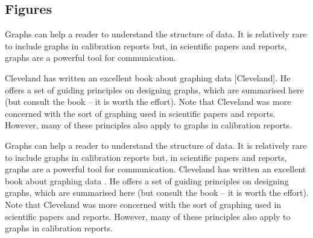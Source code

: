 \subsection{Figures}
Graphs can help a reader to understand the structure of data. It is relatively rare to include graphs in calibration reports but, in scientific papers and reports, graphs are a powerful tool for communication.

Cleveland has written an excellent book about graphing data [Cleveland]. He offers a set of guiding principles on designing graphs, which are summarised here (but consult the book – it is worth the effort). Note that Cleveland was more concerned with the sort of graphing used in scientific papers and reports. However, many of these principles also apply to graphs in calibration reports.

Graphs can help a reader to understand the structure of data. It is relatively rare to include graphs in calibration reports but, in scientific papers and reports, graphs are a powerful tool for communication.
Cleveland has written an excellent book about graphing data \cite{Cleveland}. He offers a set of guiding principles on designing graphs, which are summarised here (but consult the book – it is worth the effort). Note that Cleveland was more concerned with the sort of graphing used in scientific papers and reports. However, many of these principles also apply to graphs in calibration reports.

